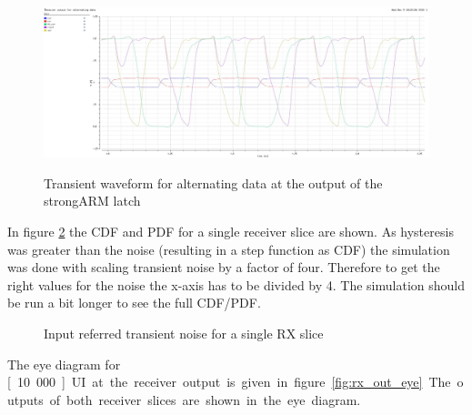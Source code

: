\begin{figure}[H]
  \centering
  {\includegraphics[angle=90, scale=0.45]{img/output_alt_trans.jpg}}
  \caption{Transient waveform for alternating data at the output of the strongARM latch}
  \label{fig:strongARM_out}
\end{figure}

In figure \ref{fig:rx_slice_pdf_cdf} the CDF and PDF for a single receiver slice are shown. As hysteresis was greater than the noise (resulting in a step function as CDF) the simulation was done with scaling transient noise by a factor of four. Therefore to get the right values for the noise the x-axis has to be divided by 4. The simulation should be run a bit longer to see the full CDF/PDF.

\begin{figure}[H]
  \centering
  \caption{Input referred transient noise for a single RX slice}
  \label{fig:rx_slice_pdf_cdf}
\end{figure}

The eye diagram for \unit[10.000]{UI} at the receiver output is given in figure \ref{fig:rx_out_eye}. The outputs of both receiver slices are shown in the eye diagram.

